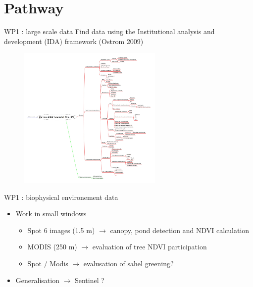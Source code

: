 \documentclass[newPxFont]{beamer}
\begin{document}
\section{Pathway}


\begin{frame}[c]{WP1 : large scale data}
\vspace{-2em}
Find data using the Institutional analysis and development (IDA) framework (Ostrom 2009)
\vspace{-1em}
\begin{figure}
	\centering
	\includegraphics[width = 7cm]{img/IDA_data_org}
\end{figure}
\end{frame}

\begin{frame}[c]{WP1 : biophysical environement data}

\begin{itemize}
  \item Work in small windows
  \begin{itemize}
    \item Spot 6 images (1.5 m) $\rightarrow$ canopy, pond detection and NDVI calculation
    \item MODIS (250 m) $\rightarrow$ evaluation of tree NDVI participation
    \item Spot / Modis $\rightarrow$ evalusation of sahel greening?
  \end{itemize}
  \item Generalisation $\rightarrow$ Sentinel ?
\end{itemize}

\end{frame}

\end{document}
